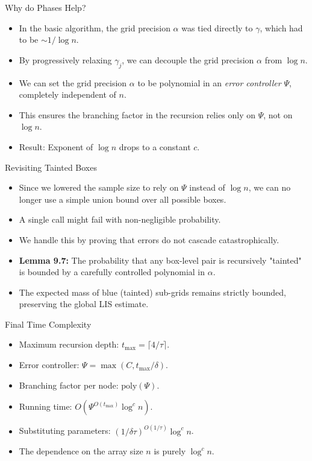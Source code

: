 \documentclass[11pt,aspectratio=169]{beamer}
\begin{document}
\begin{frame}{Why do Phases Help?}
    \begin{itemize}
        \item In the basic algorithm, the grid precision $\alpha$ was tied directly to $\gamma$, which had to be $\sim 1/\log n$.
        \item By progressively relaxing $\gamma_j$, we can decouple the grid precision $\alpha$ from $\log n$.
        \item We can set the grid precision $\alpha$ to be polynomial in an \emph{error controller} $\Psi$, completely independent of $n$.
        \item This ensures the branching factor in the recursion relies only on $\Psi$, not on $\log n$.
        \item Result: Exponent of $\log n$ drops to a constant $c$.
    \end{itemize}
\end{frame}

\begin{frame}{Revisiting Tainted Boxes}
    \begin{itemize}
        \item Since we lowered the sample size to rely on $\Psi$ instead of $\log n$, we can no longer use a simple union bound over all possible boxes.
        \item A single call might fail with non-negligible probability.
        \item We handle this by proving that errors do not cascade catastrophically.
        \item \textbf{Lemma 9.7:} The probability that any box-level pair is recursively "tainted" is bounded by a carefully controlled polynomial in $\alpha$.
        \item The expected mass of blue (tainted) sub-grids remains strictly bounded, preserving the global LIS estimate.
    \end{itemize}
\end{frame}

\begin{frame}{Final Time Complexity}
    \begin{itemize}
        \item Maximum recursion depth: $t_{\max} = \lceil 4/\tau \rceil$.
        \item Error controller: $\Psi = \max(C, t_{\max}/\delta)$.
        \item Branching factor per node: $\text{poly}(\Psi)$.
        \item Running time: $O(\Psi^{O(t_{\max})} \log^c n)$.
        \item Substituting parameters: $(1/\delta\tau)^{O(1/\tau)} \log^c n$.
        \item The dependence on the array size $n$ is purely $\log^c n$.
    \end{itemize}
\end{frame}
\end{document}
